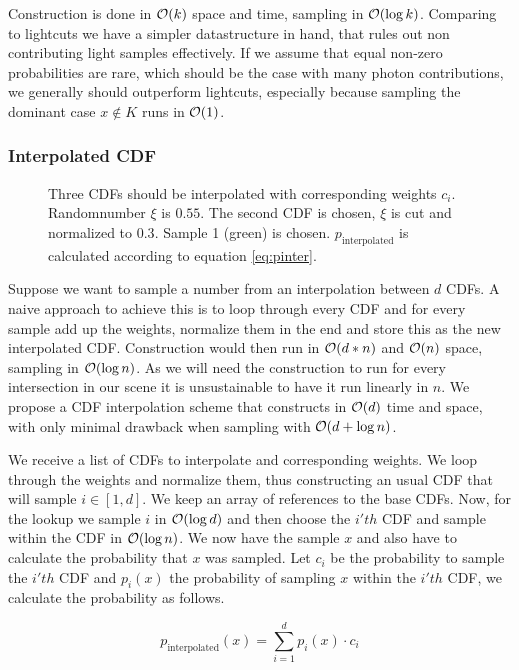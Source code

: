 Construction is done in $\mathcal{O}(k)$ space and time, sampling in $\mathcal{O}(\log{k})$. Comparing to lightcuts we have a simpler datastructure in hand, that rules out non contributing light samples effectively. If we assume that equal non-zero probabilities are rare, which should be the case with many photon contributions, we generally should outperform lightcuts, especially because sampling the dominant case $x \notin K$ runs in $\mathcal{O}(1)$. 

\subsubsection{Interpolated CDF}
\label{sec:intcdf}
\begin{figure}[htb] 
	\centering
    
    \caption{Three CDFs should be interpolated with corresponding weights $c_i$. Randomnumber $\xi$ is $0.55$. The second CDF is chosen, $\xi$ is cut and normalized to $0.3$. Sample 1 (green) is chosen. $p_{\text{interpolated}}$ is calculated according to equation \ref{eq:pinter}.} 
    \label{fig:interpolatedCDF}
\end{figure}

Suppose we want to sample a number from an interpolation between $d$ CDFs. A naive approach to achieve this is to loop through every CDF and for every sample add up the weights, normalize them in the end and store this as the new interpolated CDF. Construction would then run in $\mathcal{O}(d * n)$ and $\mathcal{O}(n)$ space, sampling in $\mathcal{O}(\log{n})$. As we will need the construction to run for every intersection in our scene it is unsustainable to have it run linearly in $n$. We propose a CDF interpolation scheme that constructs in $\mathcal{O}(d)$ time and space, with only minimal drawback when sampling with $\mathcal{O}(d + \log{n})$.

We receive a list of CDFs to interpolate and corresponding weights. We loop through the weights and normalize them, thus constructing an usual CDF that will sample $i \in [1,d]$. We keep an array of references to the base CDFs. Now, for the lookup we sample $i$ in $\mathcal{O}(\log{d})$ and then choose the $i'th$ CDF and sample within the CDF in $\mathcal{O}(\log{n})$. We now have the sample $x$ and also have to calculate the probability that $x$ was sampled. Let $c_i$ be the probability to sample the $i'th$ CDF and $p_i(x)$ the probability of sampling $x$ within the $i'th$ CDF, we calculate the probability as follows.

\begin{equation}\label{eq:pinter}
    p_{\text{interpolated}}(x) = \sum_{i=1}^{d}p_{i}(x) \cdot c_i
\end{equation}


